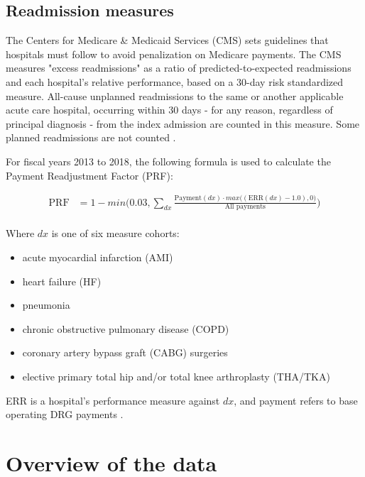 \subsection{Readmission measures}

The Centers for Medicare \& Medicaid Services (CMS) sets guidelines that hospitals must follow to avoid penalization on Medicare payments. 
The CMS measures "excess readmissions" as a ratio of predicted-to-expected readmissions and each hospital's relative performance, based on
a 30-day risk standardized measure. All-cause unplanned readmissions to the same or another applicable acute care hospital, 
occurring within 30 days - for any reason, regardless of principal diagnosis - from the index admission are counted in this measure.
Some planned readmissions are not counted \cite{HRRP}. 

For fiscal years 2013 to 2018, the following formula is used to calculate the Payment Readjustment Factor (PRF):

\begin{equation} \label{prf}
\begin{split}
  \text{PRF} &= 1 - min\bigg(0.03, \sum_{dx} \frac{\text{Payment}(dx) \cdot max\big((\text{ERR}(dx) - 1.0), 0\big)}{\text{All payments}}\bigg) \\
\end{split}
\end{equation}
 
Where $dx$ is one of six measure cohorts: 

\begin{itemize}
  \item acute myocardial infarction (AMI)
  \item heart failure (HF)
  \item pneumonia
  \item chronic obstructive pulmonary disease (COPD)
  \item coronary artery bypass graft (CABG) surgeries
  \item elective primary total hip and/or total knee arthroplasty (THA/TKA)
\end{itemize}

ERR is a hospital's performance measure against $dx$, and payment refers to base operating DRG payments \cite{HRRPPaymentAdjustment, Lessa2015}.


\section{Overview of the data}

